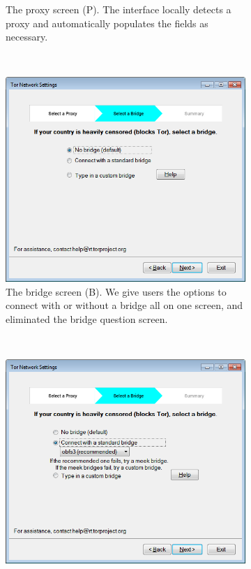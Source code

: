 \documentclass[USenglish,oneside,twocolumn]{article}
\begin{document}
\begin{figure}
\begin{subfigure}[b]{0.30\textwidth}
	\centering\captionsetup{width=1.5\linewidth}%
	\caption{The proxy screen (P). The interface locally detects a proxy and automatically populates the fields as necessary.}
	\label{fig:new-proxy}
\end{subfigure}
~~~~~~~~~~
\begin{subfigure}[b]{0.30\textwidth}
	\includegraphics[width=\textwidth]{screenshots/NEW-bridgeSettings.png}
	\centering\captionsetup{width=1.5\linewidth}%
	\caption{The bridge screen (B). We give users the options to connect with or without a bridge all on one screen, and eliminated the bridge question screen.}
	\label{fig:new-nobridge}
\end{subfigure}
~~~~~~~~~~~~~~~~~~~~~~~~~
\begin{subfigure}[b]{0.30\textwidth}
	\includegraphics[width=\textwidth]{screenshots/NEW-bridgeSettings-default.png}

\end{subfigure}
\end{figure}
\end{document}

